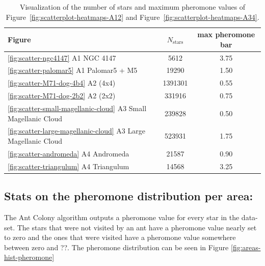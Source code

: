 \begin{table}[H]
    \centering
    \caption{Visualization of the number of stars and maximum pheromone values of Figure~\ref{fig:scatterplot-heatmaps-A12} and Figure~\ref{fig:scatterplot-heatmaps-A34}.}
    \label{tb:Nstars-in-reffig}
    \begin{tabular}{l c c }
        \toprule
        Figure                                                             & $N_{\text{stars}}$ & max pheromone bar \\
        \midrule
        \ref{fig:scatter-ngc4147} A1 NGC 4147                              & 5612               & 3.75              \\
        \ref{fig:scatter-palomar5} A1 Palomar5 + M5                        & 19290              & 1.50              \\
        \ref{fig:scatter-M71-dog-4b4} A2 (4x4)                             & 1391301            & 0.55              \\
        \ref{fig:scatter-M71-dog-2b2} A2 (2x2)                             & 331916             & 0.75              \\
        \ref{fig:scatter-small-magellanic-cloud} A3 Small Magellanic Cloud & 239828             & 0.50              \\
        \ref{fig:scatter-large-magellanic-cloud} A3 Large Magellanic Cloud & 523931             & 1.75              \\
        \ref{fig:scatter-andromeda} A4 Andromeda                           & 21587              & 0.90              \\
        \ref{fig:scatter-triangulum} A4 Triangulum                         & 14568              & 3.25              \\
        \bottomrule
    \end{tabular}
\end{table}


\subsection{Stats on the pheromone distribution \textbf{per area}:}

The Ant Colony algorithm outputs a pheromone value for every star in the data-set. The stars that were not visited by an ant have a pheromone value nearly set to zero and the ones that were visited have a pheromone value somewhere between zero and ??. The pheromone distribution can be seen in Figure \ref{fig:areas-hist-pheromone}

